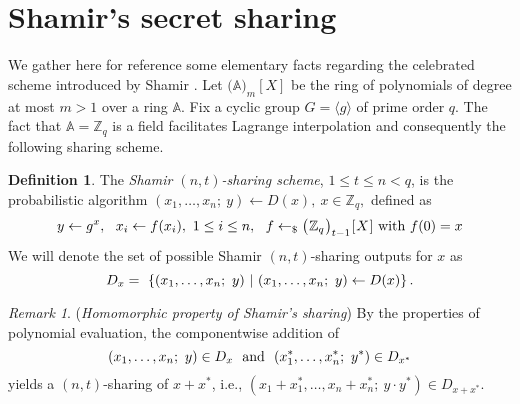 \documentclass[psamsfonts, reqno]{amsart}
\theoremstyle{definition}
\newtheorem{defn}[thm]{Definition}
\theoremstyle{remark}
\newtheorem{rem}[thm]{Remark}
\numberwithin{equation}{section}
\begin{document}
\appendix

\section{Shamir's secret sharing}\label{section_shamir}

\noindent
We gather here for reference some elementary facts regarding
the celebrated scheme introduced by Shamir
\cite{paper_shamir}.
Let
$\big(\mathbb{A}\big)_m[X]$ be the ring of polynomials of degree
at most $m > 1$ over a ring $\mathbb{A}$.
Fix a cyclic group $G = \langle g \rangle$ of prime order $q$.
The fact that $\mathbb{A} = \mathbb{Z}_q$ is a field facilitates
Lagrange interpolation and consequently
the following sharing scheme.

\begin{defn}\label{shamir_definition}
The \textit{Shamir $(n, t)$-sharing scheme}, $1 \le t \le n < q$,
is the probabilistic algorithm
$(x_1, \dots, x_n;\ y) \leftarrow D(x),\ x \in \mathbb{Z}_q,$
defined as
\vspace{5pt}
\begin{equation*}
y \leftarrow g ^ x,
\ \ x_i \leftarrow f(x_i),
\ 1 \le i \le n,
\ \ f \leftarrow_\$ \big(
	\hspace{0.5pt}
	\mathbb{Z}_q
	\hspace{0.5pt}
	\big)_{t-1}
	\hspace{0.5pt}
	[
		\hspace{0.5pt}
		X
		\hspace{0.5pt}
	]
\textup{ with }
f(0) = x
\hspace{0pt}
\vspace{5pt}
\end{equation*}
We will denote the set of possible
Shamir $(n, t)$-sharing outputs for $x$ as
\vspace{5pt}
\begin{equation*}
D_x =\
\left\{(x_1, \dots, x_n;\ y)
\ \middle\vert
\ (x_1, \dots, x_n;\ y) \leftarrow D(x)
\right\}
\hspace{0pt}.
\vspace{5pt}
\end{equation*}
\end{defn}

\begin{rem}\label{shamir_homomorphism}
(\textit{Homomorphic property of Shamir's sharing})
By the properties of polynomial evaluation,
the componentwise addition of
\vspace{5pt}
\begin{equation*}
(x_1, \dots, x_n;\ y) \in D_x
\ \textup{ and }
\ (x^*_1, \dots, x^*_n;\ y^*) \in D_{x^*}
\vspace{5pt}
\end{equation*}
yields a $(n, t)$-sharing of $x + x^*$, i.e.,
$
(x_1 + x^*_1, \dots, x_n + x^*_n;\ y \cdot y^*) \in D_{x + x^*}
$.
\vspace{5pt}
\end{rem}
\end{document}
